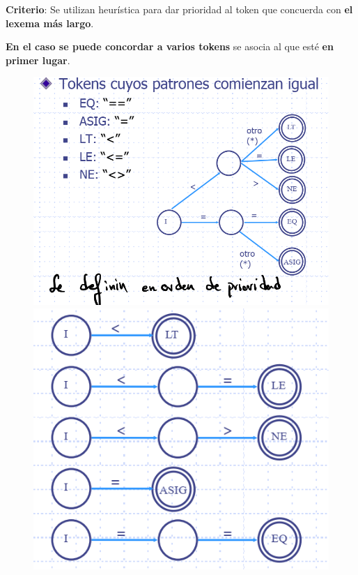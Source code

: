 \documentclass[12pt]{report} %
\begin{document}
\textbf{Criterio}: Se utilizan heurística para dar prioridad al token
que concuerda con \textbf{el lexema más largo}.

\textbf{En el caso se puede concordar a varios tokens} se asocia al que
esté \textbf{en primer lugar}.

\begin{figure}[H]
	{\includegraphics[scale=.3]{image-20210305191616426.png}
	\includegraphics[scale=.3]{image-20210305191651759.png}}
\end{figure}
\end{document}
